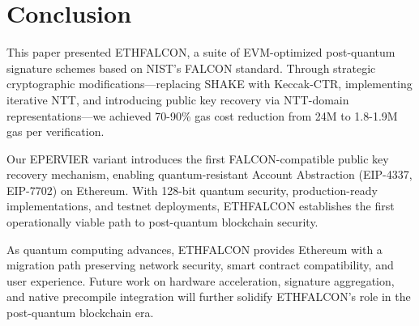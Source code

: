 \section{Conclusion}


This paper presented ETHFALCON, a suite of EVM-optimized post-quantum signature schemes based on NIST's FALCON standard. Through strategic cryptographic modifications---replacing SHAKE with Keccak-CTR, implementing iterative NTT, and introducing public key recovery via NTT-domain representations---we achieved 70-90\% gas cost reduction from 24M to 1.8-1.9M gas per verification.

Our EPERVIER variant introduces the first FALCON-compatible public key recovery mechanism, enabling quantum-resistant Account Abstraction (EIP-4337, EIP-7702) on Ethereum. With 128-bit quantum security, production-ready implementations, and testnet deployments, ETHFALCON establishes the first operationally viable path to post-quantum blockchain security.

As quantum computing advances, ETHFALCON provides Ethereum with a migration path preserving network security, smart contract compatibility, and user experience. Future work on hardware acceleration, signature aggregation, and native precompile integration will further solidify ETHFALCON's role in the post-quantum blockchain era.

